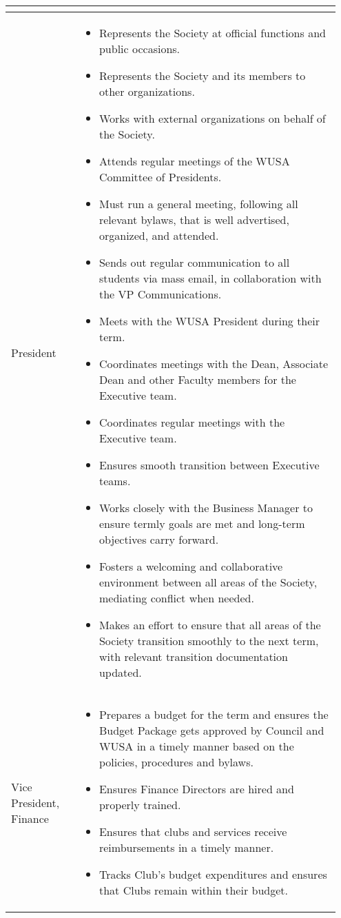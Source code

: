 \begin{longtable}{p{0.2\linewidth} p{0.75\linewidth}}
\begin{itemize}
\end{itemize}
\\
\midrule
President &
\begin{itemize}
\item Represents the Society at official functions and public occasions.
\item Represents the Society and its members to other organizations.
\item Works with external organizations on behalf of the Society.
\item Attends regular meetings of the WUSA Committee of Presidents.
\item Must run a general meeting, following all relevant bylaws, that is well advertised, organized, and attended.
\item Sends out regular communication to all students via mass email, in collaboration with the VP Communications.
\item Meets with the WUSA President during their term.
\item Coordinates meetings with the Dean, Associate Dean and other Faculty members for the Executive team.
\item Coordinates regular meetings with the Executive team.
\item Ensures smooth transition between Executive teams.
\item Works closely with the Business Manager to ensure termly goals are met and long-term objectives carry forward.
\item Fosters a welcoming and collaborative environment between all areas of the Society, mediating conflict when needed.
\item Makes an effort to ensure that all areas of the Society transition smoothly to the next term, with relevant transition documentation updated.
\end{itemize}
\\
\midrule
Vice President, Finance &
\begin{itemize}
\item Prepares a budget for the term and ensures the Budget Package gets approved by Council and WUSA in a timely manner based on the policies, procedures and bylaws.
\item Ensures Finance Directors are hired and properly trained.
\item Ensures that clubs and services receive reimbursements in a timely manner.
\item Tracks Club's budget expenditures and ensures that Clubs remain within their budget.

\end{itemize}
\end{longtable}
